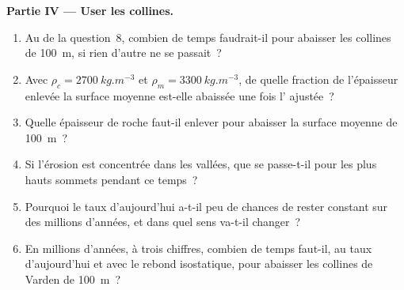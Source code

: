 \begin{problem}
\medskip
\noindent\textbf{Partie IV --- User les collines.}
\begin{enumerate}[resume]
  \item Au  de la question~8, combien de temps faudrait-il pour abaisser
        les collines de \qty{100}{m}, si rien d'autre ne se passait~?
  \item Avec $\rho_c = \qty{2700}{kg.m^{-3}}$ et $\rho_m =
        \qty{3300}{kg.m^{-3}}$, de quelle fraction de l'épaisseur enlevée
        la surface moyenne est-elle abaissée une fois l' ajustée~?
  \item Quelle épaisseur de roche faut-il enlever pour abaisser la surface moyenne de
        \qty{100}{m}~?
  \item Si l'érosion est concentrée dans les vallées, que se passe-t-il pour les
        plus hauts sommets pendant ce temps~?
  \item Pourquoi le taux d'aujourd'hui a-t-il peu de chances de rester constant sur des millions
        d'années, et dans quel sens va-t-il changer~?
  \item En millions d'années, à trois chiffres, combien de temps faut-il, au
        taux d'aujourd'hui et avec le rebond isostatique, pour abaisser les collines de Varden de
        \qty{100}{m}~?
\end{enumerate}
\end{problem}
